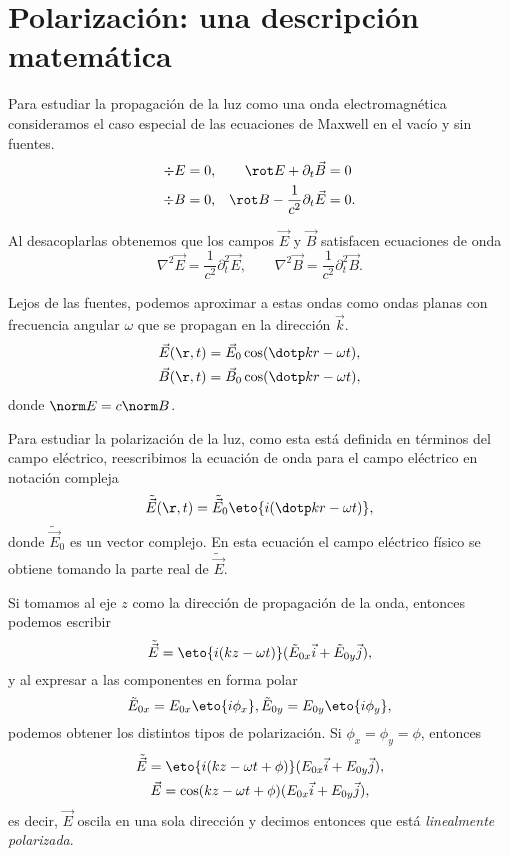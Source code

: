 \section{Polarización: una descripción matemática}\label{sec: teo}

Para estudiar la propagación de la luz como una onda electromagnética consideramos el caso especial de las ecuaciones de Maxwell en el vacío y sin fuentes.
\begin{align}
    \div E &= 0, & \rot E + \partial_t \vec B &= 0\\
    \div B &= 0, & \rot B - \frac{1}{c^2}\partial_t \vec E &= 0.
\end{align}

Al desacoplarlas obtenemos que los campos $\vec E$ y $\vec B$ satisfacen ecuaciones de onda
\begin{equation}
    \nabla^2 \vec E = \frac{1}{c^2}\partial^2_t \vec E, \qquad \nabla^2 \vec B = \frac{1}{c^2}\partial^2_t \vec B.
\end{equation}

Lejos de las fuentes, podemos aproximar a estas ondas como ondas planas con frecuencia angular $\omega$ que se propagan en la dirección $\vec k$.
\begin{gather}
    \vec E(\r, t) = \vec E_0 \cos(\dotp k r - \omega t),\\
    \vec B(\r, t) = \vec B_0 \cos(\dotp k r - \omega t),
\end{gather}
donde $\norm E = c\norm B$.

Para estudiar la polarización de la luz, como esta está definida en términos del campo eléctrico, reescribimos la ecuación de onda para el campo eléctrico en notación compleja
\begin{equation}
    \tilde{\vec E}(\r, t) = \tilde{\vec E}_0 \eto{i(\dotp k r - \omega t)},
\end{equation}
donde $\tilde{\vec E}_0$ es un vector complejo. En esta ecuación el campo eléctrico físico se obtiene tomando la parte real de $\tilde{\vec E}$.

Si tomamos al eje $z$ como la dirección de propagación de la onda, entonces podemos escribir
\begin{equation}\label{eq: complexE}
    \tilde{\vec E} = \eto{i(kz - \omega t)}(\tilde{E}_{0x}  \vec i + \tilde{E}_{0y}  \vec j),
\end{equation}
y al expresar a las componentes en forma polar
\begin{equation}\label{eq: amplitudes}
    \tilde{E}_{0x} = E_{0x}\eto{i\phi_x},
    \tilde{E}_{0y} = E_{0y}\eto{i\phi_y},
\end{equation}
podemos obtener los distintos tipos de polarización. Si $\phi_x = \phi_y = \phi$, entonces
\begin{gather}
    \tilde{\vec E} = \eto{i(kz - \omega t + \phi)}(E_{0x}  \vec i + E_{0y}  \vec j),\\
    \vec E = \cos(kz - \omega t + \phi)(E_{0x}  \vec i + E_{0y}  \vec j),
\end{gather}
es decir, $\vec E$ oscila en una sola dirección y decimos entonces que está \emph{linealmente polarizada}.


